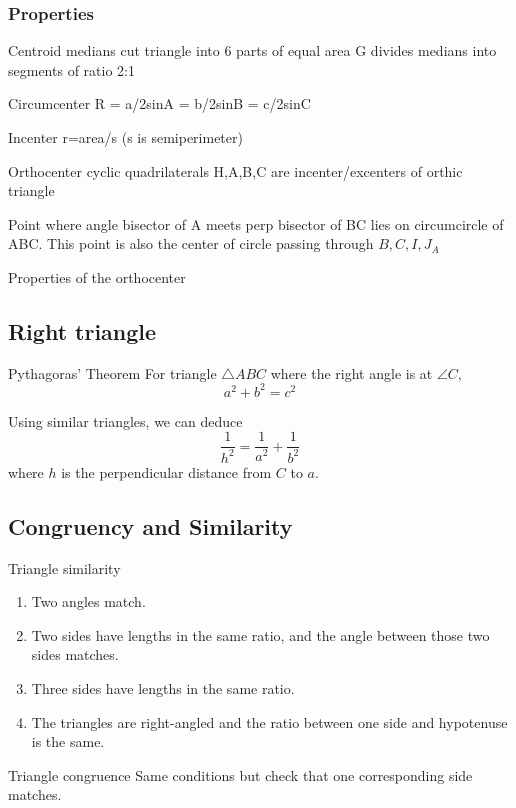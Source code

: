 \subsubsection{Properties}
Centroid
medians cut triangle into 6 parts of equal area
G divides medians into segments of ratio 2:1

Circumcenter
R = a/2sinA = b/2sinB = c/2sinC

Incenter
r=area/s (s is semiperimeter)

Orthocenter
cyclic quadrilaterals
H,A,B,C are incenter/excenters of orthic triangle

Point where angle bisector of A meets perp bisector of BC lies on circumcircle of ABC. This point is also the center of circle passing through $B,C,I,J_A$

Properties of the orthocenter

\subsection{Right triangle}
\begin{thrm}{Pythagoras' Theorem}{}
For triangle $\triangle ABC$ where the right angle is at $\angle C$,
\begin{equation}
a^2+b^2=c^2
\end{equation}
\end{thrm}

Using similar triangles, we can deduce
\begin{equation}
\frac{1}{h^2}=\frac{1}{a^2}+\frac{1}{b^2}
\end{equation}
where $h$ is the perpendicular distance from $C$ to $a$.

\subsection{Congruency and Similarity}
Triangle similarity
\begin{enumerate}
    \item Two angles match.
    \item Two sides have lengths in the same ratio, and the angle between those two sides matches.
    \item Three sides have lengths in the same ratio.
    \item The triangles are right-angled and the ratio between one side and hypotenuse is the same.
\end{enumerate}

Triangle congruence
Same conditions but check that one corresponding side matches.

